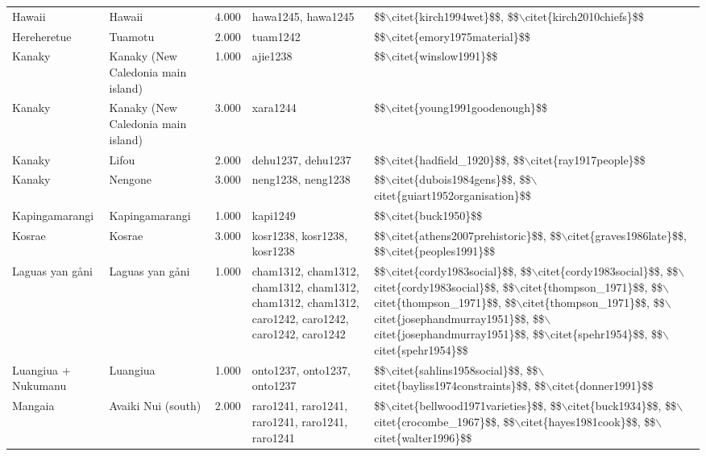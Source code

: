 \begin{longtable}{p{1.8cm}p{1.8cm}p{1.8cm}p{2cm}p{7cm}}
  Hawaii & Hawaii & 4.000 & hawa1245, hawa1245 & \$\$$\backslash$citet\{kirch1994wet\}\$\$, \$\$$\backslash$citet\{kirch2010chiefs\}\$\$ \\ 
  Hereheretue & Tuamotu & 2.000 & tuam1242 & \$\$$\backslash$citet\{emory1975material\}\$\$ \\ 
  Kanaky & Kanaky (New Caledonia main island) & 1.000 & ajie1238 & \$\$$\backslash$citet\{winslow1991\}\$\$ \\ 
  Kanaky & Kanaky (New Caledonia main island) & 3.000 & xara1244 & \$\$$\backslash$citet\{young1991goodenough\}\$\$ \\ 
  Kanaky & Lifou & 2.000 & dehu1237, dehu1237 & \$\$$\backslash$citet\{hadfield\_1920\}\$\$, \$\$$\backslash$citet\{ray1917people\}\$\$ \\ 
  Kanaky & Nengone & 3.000 & neng1238, neng1238 & \$\$$\backslash$citet\{dubois1984gens\}\$\$, \$\$$\backslash$citet\{guiart1952organisation\}\$\$ \\ 
  Kapingamarangi & Kapingamarangi & 1.000 & kapi1249 & \$\$$\backslash$citet\{buck1950\}\$\$ \\ 
  Kosrae & Kosrae & 3.000 & kosr1238, kosr1238, kosr1238 & \$\$$\backslash$citet\{athens2007prehistoric\}\$\$, \$\$$\backslash$citet\{graves1986late\}\$\$, \$\$$\backslash$citet\{peoples1991\}\$\$ \\ 
  Laguas yan gåni & Laguas yan gåni & 1.000 & cham1312, cham1312, cham1312, cham1312, cham1312, cham1312, caro1242, caro1242, caro1242, caro1242 & \$\$$\backslash$citet\{cordy1983social\}\$\$, \$\$$\backslash$citet\{cordy1983social\}\$\$, \$\$$\backslash$citet\{cordy1983social\}\$\$, \$\$$\backslash$citet\{thompson\_1971\}\$\$, \$\$$\backslash$citet\{thompson\_1971\}\$\$, \$\$$\backslash$citet\{thompson\_1971\}\$\$, \$\$$\backslash$citet\{josephandmurray1951\}\$\$, \$\$$\backslash$citet\{josephandmurray1951\}\$\$, \$\$$\backslash$citet\{spehr1954\}\$\$, \$\$$\backslash$citet\{spehr1954\}\$\$ \\ 
  Luangiua + Nukumanu & Luangiua & 1.000 & onto1237, onto1237, onto1237 & \$\$$\backslash$citet\{sahlins1958social\}\$\$, \$\$$\backslash$citet\{bayliss1974constraints\}\$\$, \$\$$\backslash$citet\{donner1991\}\$\$ \\ 
  Mangaia & Avaiki Nui (south) & 2.000 & raro1241, raro1241, raro1241, raro1241, raro1241 & \$\$$\backslash$citet\{bellwood1971varieties\}\$\$, \$\$$\backslash$citet\{buck1934\}\$\$, \$\$$\backslash$citet\{crocombe\_1967\}\$\$, \$\$$\backslash$citet\{hayes1981cook\}\$\$, \$\$$\backslash$citet\{walter1996\}\$\$ \\ 

\end{longtable}
